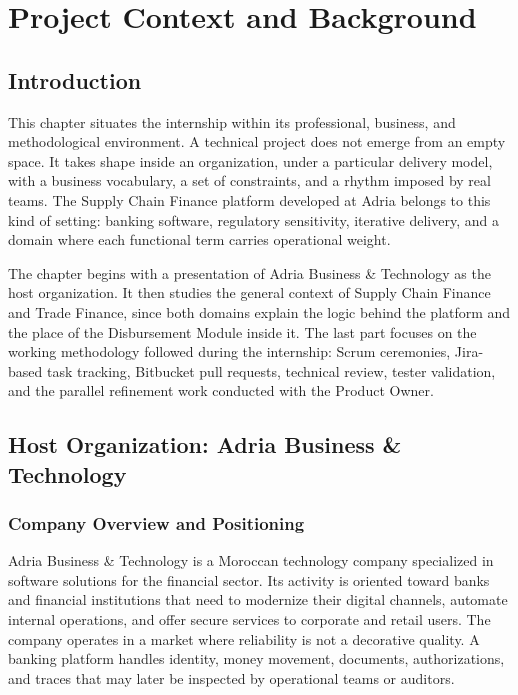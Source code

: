 \chapter{Project Context and Background}
\label{chap:project_context}

\section{Introduction}
\label{sec:ch1_introduction}

This chapter situates the internship within its professional, business, and methodological environment. A technical project does not emerge from an empty space. It takes shape inside an organization, under a particular delivery model, with a business vocabulary, a set of constraints, and a rhythm imposed by real teams. The Supply Chain Finance platform developed at Adria belongs to this kind of setting: banking software, regulatory sensitivity, iterative delivery, and a domain where each functional term carries operational weight.

The chapter begins with a presentation of Adria Business \& Technology as the host organization. It then studies the general context of Supply Chain Finance and Trade Finance, since both domains explain the logic behind the platform and the place of the Disbursement Module inside it. The last part focuses on the working methodology followed during the internship: Scrum ceremonies, Jira-based task tracking, Bitbucket pull requests, technical review, tester validation, and the parallel refinement work conducted with the Product Owner.

\section{Host Organization: Adria Business \& Technology}
\label{sec:host_organization}

\subsection{Company Overview and Positioning}
\label{subsec:company_overview}

Adria Business \& Technology is a Moroccan technology company specialized in software solutions for the financial sector. Its activity is oriented toward banks and financial institutions that need to modernize their digital channels, automate internal operations, and offer secure services to corporate and retail users. The company operates in a market where reliability is not a decorative quality. A banking platform handles identity, money movement, documents, authorizations, and traces that may later be inspected by operational teams or auditors.

